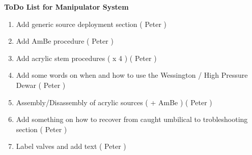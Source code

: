 \documentclass[]{report}
\newcommand{\shwlabel}[1]{\label{#1}}
\newcommand{\newprocedure}[5]{     %
\shwlabel{#1}
\markright{Intro: #2 Rev.#5}
~\\
\begin{tabular}{|l|l|}
\hline
Written/Revised By  &  #3 \\
\hline
Date        &  #4 \\
\hline
Revision     &  #5 \\
\hline
\end{tabular}
~\\
\vspace*{0.25in}
}
\begin{document}

\clearpage
\begin{center}
{\huge\bf ToDo List for Manipulator System}
\begin{enumerate}
\item Add generic source deployment section ( Peter )
\item Add AmBe procedure ( Peter )
\item Add acrylic stem procedures ( x 4 ) ( Peter )
\item Add some words on when and how to use the Wessington / High Pressure Dewar ( Peter )
\item Assembly/Disassembly of acrylic sources ( + AmBe )  ( Peter )
\item Add something on how to recover from caught umbilical to trobleshooting section ( Peter )
\item Label valves and add text ( Peter )
\end{enumerate}
\end{center}






\renewcommand{\newprocedure}[5]{
\shwlabel{#1}
\markright{CalOp: #2 Rev.#5}
~\\
\begin{tabular}{|l|l|}
\hline
Written/Revised By  &  #3 \\
\hline
Date        &  #4 \\
\hline
Revision     &  #5 \\
\hline
\end{tabular}
~\\
\vspace*{0.25in}
}











\end{document}
